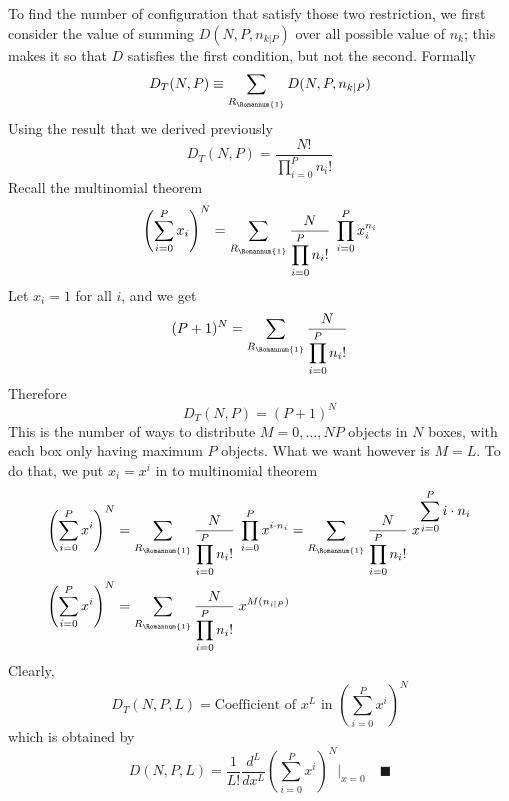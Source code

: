 \documentclass[../../../main.tex]{subfiles}
\begin{document}
To find the number of configuration that satisfy those two restriction, we first consider the value of summing $D(N,P,n_{k|P})$ over all possible value of $n_k$; this makes it so that $D$ satisfies the first condition, but not the second. Formally
\begin{equation*}
    D_T(N,P)\equiv \sum_{R_\Romannum{1}}D(N,P,n_{k|P})
\end{equation*}
Using the result that we derived previously
\begin{equation*}
    D_T(N,P)= \frac{N!}{\displaystyle\prod_{i=0}^{P}n_i!}
\end{equation*}
Recall the multinomial theorem
\begin{equation*}
    \left(\sum_{i=0 }^{P}x_i\right)^N=\sum_{R_\Romannum{1}}^{}\frac{N}{\displaystyle\prod_{i=0}^{P}n_i!} \; \prod_{i=0}^{P}x_{i}^{n_{i}}
\end{equation*}
Let $x_i=1$ for all $i$, and we get
\begin{equation*}
    (P+1)^N=\sum_{R_\Romannum{1}}^{}\frac{N}{\displaystyle\prod_{i=0}^{P}n_i!}
\end{equation*}
Therefore
\begin{equation*}
    D_T(N,P)=(P+1)^N
\end{equation*}
This is the number of ways to distribute $M=0,\dots, NP$ objects in $N$ boxes, with each box only having maximum $P$ objects. What we want however is $M=L$. To do that, we put $x_i=x^i$ in to multinomial theorem
\begin{align*}
    \left(\sum_{i=0 }^{P}x^i\right)^N & =\sum_{R_\Romannum{1}}^{}\frac{N}{\displaystyle\prod_{i=0}^{P}n_i!} \; \prod_{i=0}^{P}x^{i\cdot n_{i}}
    =\sum_{R_\Romannum{1}}^{}\frac{N}{\displaystyle\prod_{i=0}^{P}n_i!} \; x^{\displaystyle\sum_{i=0}^{P}i\cdot n_{i}}                         \\
    \left(\sum_{i=0 }^{P}x^i\right)^N & =\sum_{R_\Romannum{1}}^{}\frac{N}{\displaystyle\prod_{i=0}^{P}n_i!} \; x^{M(n_{i|P})}
\end{align*}
Clearly,
\begin{equation*}
    D_T(N,P,L)=\text{Coefficient of $x^L$ in } \left(\sum_{i=0 }^{P}x^i\right)^N
\end{equation*}
which is obtained by
\begin{equation*}
    D(N,P,L)=\frac{1}{L!}\frac{d^L}{dx^L}\left(\sum_{i=0 }^{P}x^i\right)^N \bigg|_{x=0}\quad\blacksquare
\end{equation*}
\end{document}

